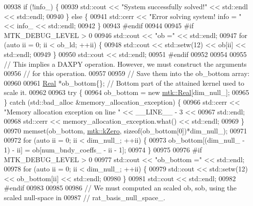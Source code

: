 \begin{DoxyCode}
{{00938     \textcolor{keywordflow}{if} (!info\_) \{
00939       std::cout << \textcolor{stringliteral}{"System successfully solved!"} << std::endl << std::endl;
00940     \} \textcolor{keywordflow}{else} \{
00941       std::cerr << \textcolor{stringliteral}{"Error solving system! info = "} << info\_ << std::endl;
00942     \}
00943 \textcolor{preprocessor}{    #endif}
00944 
00945 \textcolor{preprocessor}{    #if MTK\_DEBUG\_LEVEL > 0}
00946     std::cout << \textcolor{stringliteral}{"ob ="} << std::endl;
00947     \textcolor{keywordflow}{for} (\textcolor{keyword}{auto} ii = 0; ii < ob\_ld; ++ii) \{
00948       std::cout << std::setw(12) << ob[ii] << std::endl;
00949     \}
00950     std::cout << std::endl;
00951 \textcolor{preprocessor}{    #endif}
00952 
00954 
00955     \textcolor{comment}{// This implies a DAXPY operation. However, we must construct the arguments}
00956     \textcolor{comment}{// for this operation.}
00957 
00959     \textcolor{comment}{// Save them into the ob\_bottom array:}
00960 
00961     \hyperlink{group__c01-roots_gac080bbbf5cbb5502c9f00405f894857d}{Real} *ob\_bottom\{\}; \textcolor{comment}{// Bottom part of the attained kernel used to scale it.}
00962 
00963     \textcolor{keywordflow}{try} \{
00964       ob\_bottom = \textcolor{keyword}{new} \hyperlink{group__c01-roots_gac080bbbf5cbb5502c9f00405f894857d}{mtk::Real}[dim\_null\_];
00965     \} \textcolor{keywordflow}{catch} (std::bad\_alloc &memory\_allocation\_exception) \{
00966       std::cerr << \textcolor{stringliteral}{"Memory allocation exception on line "} << \_\_LINE\_\_ - 3 <<
00967         std::endl;
00968       std::cerr << memory\_allocation\_exception.what() << std::endl;
00969     \}
00970     memset(ob\_bottom, \hyperlink{group__c01-roots_ga59a451a5fae30d59649bcda274fea271}{mtk::kZero}, \textcolor{keyword}{sizeof}(ob\_bottom[0])*dim\_null\_);
00971 
00972     \textcolor{keywordflow}{for} (\textcolor{keyword}{auto} ii = 0; ii < dim\_null\_; ++ii) \{
00973       ob\_bottom[(dim\_null\_ - 1) - ii] = ob[num\_bndy\_coeffs\_ - ii - 1];
00974     \}
00975 
00976 \textcolor{preprocessor}{    #if MTK\_DEBUG\_LEVEL > 0}
00977     std::cout << \textcolor{stringliteral}{"ob\_bottom ="} << std::endl;
00978     \textcolor{keywordflow}{for} (\textcolor{keyword}{auto} ii = 0; ii < dim\_null\_; ++ii) \{
00979       std::cout << std::setw(12) << ob\_bottom[ii] << std::endl;
00980     \}
00981     std::cout << std::endl;
00982 \textcolor{preprocessor}{    #endif}
00983 
00985 
00986     \textcolor{comment}{// We must computed an scaled ob, sob, using the scaled null-space in}
00987     \textcolor{comment}{// rat\_basis\_null\_space\_.}
}}
\end{DoxyCode}
